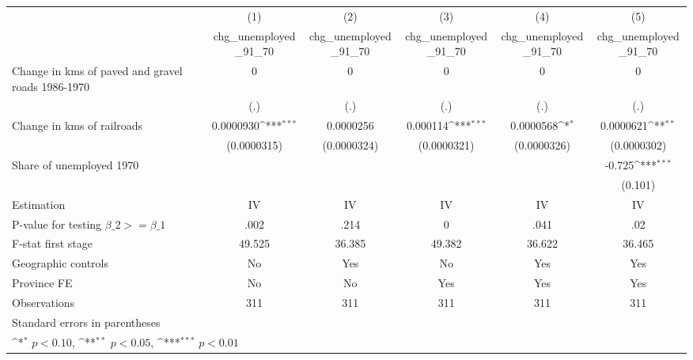 {
\def\sym#1{\ifmmode^{#1}\else\(^{#1}\)\fi}
\begin{tabular}{l*{5}{c}}
\hline\hline
                    &\multicolumn{1}{c}{(1)}&\multicolumn{1}{c}{(2)}&\multicolumn{1}{c}{(3)}&\multicolumn{1}{c}{(4)}&\multicolumn{1}{c}{(5)}\\
                    &\multicolumn{1}{c}{chg\_unemployed\_91\_70}&\multicolumn{1}{c}{chg\_unemployed\_91\_70}&\multicolumn{1}{c}{chg\_unemployed\_91\_70}&\multicolumn{1}{c}{chg\_unemployed\_91\_70}&\multicolumn{1}{c}{chg\_unemployed\_91\_70}\\
\hline
Change in kms of paved and gravel roads 1986-1970&           0         &           0         &           0         &           0         &           0         \\
                    &         (.)         &         (.)         &         (.)         &         (.)         &         (.)         \\
[1em]
Change in kms of railroads&   0.0000930\sym{***}&   0.0000256         &    0.000114\sym{***}&   0.0000568\sym{*}  &   0.0000621\sym{**} \\
                    & (0.0000315)         & (0.0000324)         & (0.0000321)         & (0.0000326)         & (0.0000302)         \\
[1em]
Share of unemployed 1970&                     &                     &                     &                     &      -0.725\sym{***}\\
                    &                     &                     &                     &                     &     (0.101)         \\
\hline
Estimation          &          IV         &          IV         &          IV         &          IV         &          IV         \\
P-value for testing $\beta\_2 >= \beta\_1$&        .002         &        .214         &           0         &        .041         &         .02         \\
F-stat first stage  &      49.525         &      36.385         &      49.382         &      36.622         &      36.465         \\
Geographic controls &          No         &         Yes         &          No         &         Yes         &         Yes         \\
Province FE         &          No         &          No         &         Yes         &         Yes         &         Yes         \\
Observations        &         311         &         311         &         311         &         311         &         311         \\
\hline\hline
\multicolumn{6}{l}{\footnotesize Standard errors in parentheses}\\
\multicolumn{6}{l}{\footnotesize \sym{*} \(p<0.10\), \sym{**} \(p<0.05\), \sym{***} \(p<0.01\)}\\
\end{tabular}
}
